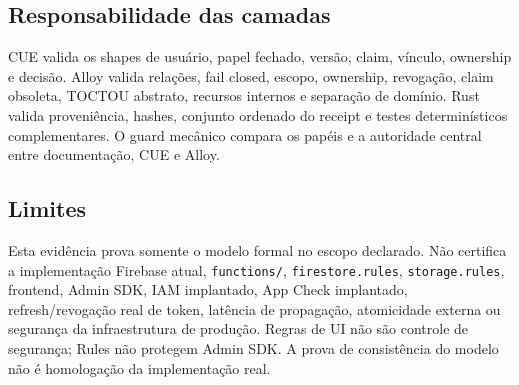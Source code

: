 \subsection*{Responsabilidade das camadas}
CUE valida os shapes de usuário, papel fechado, versão, claim, vínculo,
ownership e decisão. Alloy valida relações, fail closed, escopo, ownership,
revogação, claim obsoleta, TOCTOU abstrato, recursos internos e separação de
domínio. Rust valida proveniência, hashes, conjunto ordenado do receipt e
testes determinísticos complementares. O guard mecânico compara os papéis e a
autoridade central entre documentação, CUE e Alloy.

\begingroup\small\raggedright


\par\endgroup

\subsection*{Limites}
Esta evidência prova somente o modelo formal no escopo declarado. Não certifica
a implementação Firebase atual, \texttt{functions/}, \texttt{firestore.rules},
\texttt{storage.rules}, frontend, Admin SDK, IAM implantado, App Check
implantado, refresh/revogação real de token, latência de propagação, atomicidade
externa ou segurança da infraestrutura de produção. Regras de UI não são
controle de segurança; Rules não protegem Admin SDK. A prova de consistência do
modelo não é homologação da implementação real.
